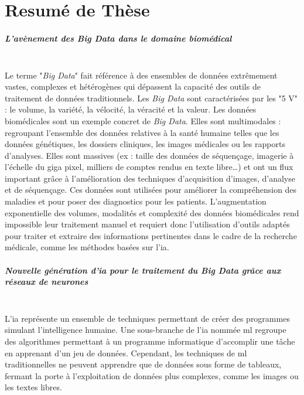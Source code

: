 \chapter{Resumé de Thèse}
\paragraph{\textbf{L’avènement des \textit{Big Data} dans le domaine biomédical}}\mbox{}\\

Le terme "\textit{Big Data}" fait référence à des ensembles de données extrêmement vastes, complexes et hétérogènes qui dépassent la capacité des outils de traitement de données traditionnels. Les \textit{Big Data} sont caractérisées par les "5 V" : le volume, la variété, la vélocité, la véracité et la valeur. Les données biomédicales sont un exemple concret de \textit{Big Data}. Elles sont multimodales : regroupant l’ensemble des données relatives à la santé humaine telles que les données génétiques, les dossiers cliniques, les images médicales ou les rapports d’analyses. Elles sont massives (ex : taille des données de séquençage, imagerie à l’échelle du giga pixel, milliers de comptes rendus en texte libre…) et ont un flux important grâce à l’amélioration des techniques d’acquisition d’images, d’analyse et de séquençage. Ces données sont utilisées pour améliorer la compréhension des maladies et pour poser des diagnostics pour les patients. L’augmentation exponentielle des volumes, modalités et complexité des données biomédicales rend impossible leur traitement manuel et requiert donc l’utilisation d’outils adaptés pour traiter et extraire des informations pertinentes dans le cadre de la recherche médicale, comme les méthodes basées sur l’\gls{ia}.

\paragraph{\textbf{Nouvelle génération d’\gls{ia} pour le traitement du \textit{Big Data} grâce aux réseaux de neurones}}\mbox{}\\

L’\gls{ia} représente un ensemble de techniques permettant de créer des programmes simulant l’intelligence humaine. Une sous-branche de l’\gls{ia} nommée \gls{ml} regroupe des algorithmes permettant à un programme informatique d’accomplir une tâche en apprenant d’un jeu de données. Cependant, les techniques de \gls{ml} traditionnelles ne peuvent apprendre que de données sous forme de tableaux, fermant la porte à l’exploitation de données plus complexes, comme les images ou les textes libres.

